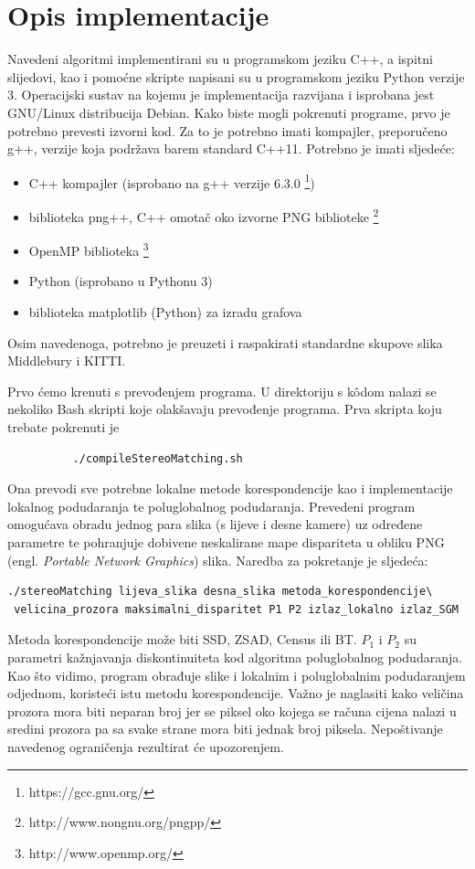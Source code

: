 \documentclass[utf8, zavrsni, numeric]{fer}
\begin{document}
\chapter{Opis implementacije}

Navedeni algoritmi implementirani su u programskom jeziku C++, a ispitni slijedovi, kao i pomoćne skripte napisani su u programskom jeziku Python verzije 3.
Operacijski sustav na kojemu je implementacija razvijana i isprobana jest GNU/Linux distribucija Debian.
Kako biste mogli pokrenuti programe, prvo je potrebno prevesti izvorni kod. Za to je potrebno imati kompajler, preporučeno g++, verzije koja podržava barem standard C++11.
Potrebno je imati sljedeće:
\begin{itemize}
\item C++ kompajler (isprobano na g++ verzije 6.3.0 \footnote{https://gcc.gnu.org/})
\item biblioteka png++, C++ omotač oko izvorne PNG biblioteke \footnote{http://www.nongnu.org/pngpp/}
\item OpenMP biblioteka \footnote{http://www.openmp.org/}
\item Python (isprobano u Pythonu 3)
\item biblioteka matplotlib (Python) za izradu grafova
\end{itemize}

Osim navedenoga, potrebno je preuzeti i raspakirati standardne skupove slika Middlebury i
KITTI.

Prvo ćemo krenuti s prevođenjem programa. U direktoriju s k\^odom nalazi se nekoliko Bash skripti koje olakšavaju prevođenje programa. Prva skripta koju trebate pokrenuti je
\begin{verbatim}
          ./compileStereoMatching.sh
\end{verbatim}
Ona prevodi sve potrebne lokalne metode korespondencije kao i implementacije lokalnog podudaranja te poluglobalnog podudaranja. Prevedeni program omogućava obradu jednog para slika (s lijeve i desne kamere) uz određene parametre te pohranjuje dobivene neskalirane mape dispariteta
u obliku PNG (engl. {\sl Portable Network Graphics}) slika. Naredba za pokretanje je sljedeća:
\begin{verbatim}
./stereoMatching lijeva_slika desna_slika metoda_korespondencije\
 velicina_prozora maksimalni_disparitet P1 P2 izlaz_lokalno izlaz_SGM
\end{verbatim}
Metoda korespondencije može biti SSD, ZSAD, Census ili BT. $P_1$ i $P_2$ su parametri kažnjavanja
diskontinuiteta kod algoritma poluglobalnog podudaranja. Kao što vidimo, program obrađuje slike
i lokalnim i poluglobalnim podudaranjem odjednom, koristeći istu metodu korespondencije.
Važno je naglasiti kako veličina prozora mora biti neparan broj jer se piksel oko kojega se računa cijena nalazi u sredini prozora pa sa svake strane mora biti jednak broj piksela.
Nepoštivanje navedenog ograničenja rezultirat će upozorenjem.
\end{document}
